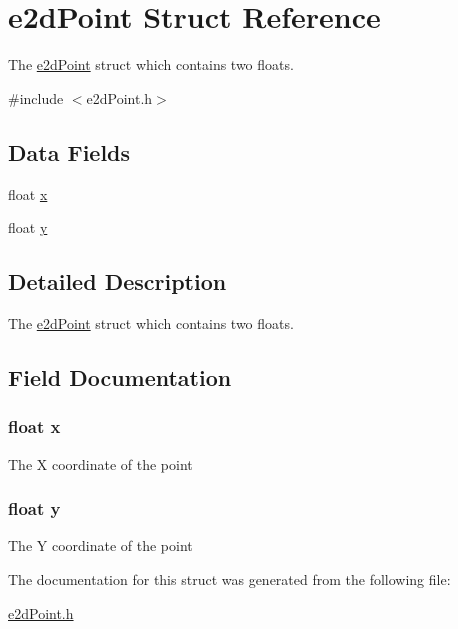 \hypertarget{structe2dPoint}{\section{e2d\-Point Struct Reference}
\label{structe2dPoint}
}


The \hyperlink{structe2dPoint}{e2d\-Point} struct which contains two floats.  




{\ttfamily \#include $<$e2d\-Point.\-h$>$}

\subsection*{Data Fields}
\begin{DoxyCompactItemize}
\item 
float \hyperlink{structe2dPoint_ad0da36b2558901e21e7a30f6c227a45e}{x}
\item 
float \hyperlink{structe2dPoint_aa4f0d3eebc3c443f9be81bf48561a217}{y}
\end{DoxyCompactItemize}


\subsection{Detailed Description}
The \hyperlink{structe2dPoint}{e2d\-Point} struct which contains two floats. 

\subsection{Field Documentation}
\hypertarget{structe2dPoint_ad0da36b2558901e21e7a30f6c227a45e}{
\subsubsection[{x}]{\setlength{\rightskip}{0pt plus 5cm}float {\bf x}}}\label{structe2dPoint_ad0da36b2558901e21e7a30f6c227a45e}
The X coordinate of the point \hypertarget{structe2dPoint_aa4f0d3eebc3c443f9be81bf48561a217}{
\subsubsection[{y}]{\setlength{\rightskip}{0pt plus 5cm}float {\bf y}}}\label{structe2dPoint_aa4f0d3eebc3c443f9be81bf48561a217}
The Y coordinate of the point 

The documentation for this struct was generated from the following file\-:\begin{DoxyCompactItemize}
\item 
\hyperlink{e2dPoint_8h}{e2d\-Point.\-h}\end{DoxyCompactItemize}
